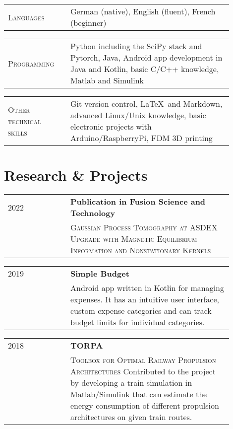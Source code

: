 \documentclass[a4paper, 10pt]{article}
\newenvironment{cventry}[2]
{   
    \setlength{\tabcolsep}{1.25em}
    \hypersetup{urlcolor=black}
    \begin{center}\hspace{-1.25cm}\begin{tabular}{p{0.25\linewidth}|p{0.65\linewidth}}
    \raggedleft\scshape #1 & \bfseries#2 \vspace{0.1cm}\\ & 
}
{\end{tabular}\end{center}}
\newenvironment{cventrynoheading}[1]
{
    \setlength{\tabcolsep}{1.25em}
    \begin{center}\hspace{-1.25cm}\begin{tabular}{p{0.25\linewidth}|p{0.65\linewidth}}
    \raggedleft\scshape #1 & 
}
{\end{tabular}\end{center}}
\begin{document}
\begin{cventrynoheading}{Languages}
    German (native), English (fluent), French (beginner)
\end{cventrynoheading}

\begin{cventrynoheading}{Programming}
    Python including the SciPy stack and Pytorch, Java, Android app development 
    in Java and Kotlin, basic C/C++ knowledge, Matlab and Simulink
\end{cventrynoheading}

\begin{cventrynoheading}{Other technical skills}
    Git version control, \LaTeX\ and Markdown, advanced Linux/Unix knowledge, 
    basic electronic projects with Arduino/RaspberryPi, FDM 3D printing
\end{cventrynoheading}


\section{Research \& Projects}

\begin{cventry}{2022}{Publication in Fusion Science and Technology 
    \href{https://doi.org/10.1080/15361055.2022.2072659}{\footnotesize\faIcon{link}}}
    {\scshape Gaussian Process Tomography at ASDEX Upgrade with 
    Magnetic Equilibrium Information and Nonstationary Kernels}
\end{cventry}

\begin{cventry}{2019}
    {Simple Budget \href{https://github.com/korbi98/Simple-Budget}{\normalfont\faGithub}}
    Android app written in Kotlin for managing expenses. It has an intuitive 
    user interface, custom expense categories and can track budget limits 
    for individual categories.
\end{cventry}

\begin{cventry}{2018}
    {TORPA 
    \href{https://www.researchgate.net/publication/328813199_Development_of_a_dynamic_driving_simulation_model_for_automated_design_of_regional_trains'_hybrid_propulsion_architecture}
    {\footnotesize\faIcon{link}}}
    {\scshape Toolbox for Optimal Railway Propulsion Architectures}
    Contributed to the project by developing a train simulation 
    in Matlab/Simulink that can estimate the energy consumption of 
    different propulsion architectures on given train routes.
\end{cventry}
\end{document}
